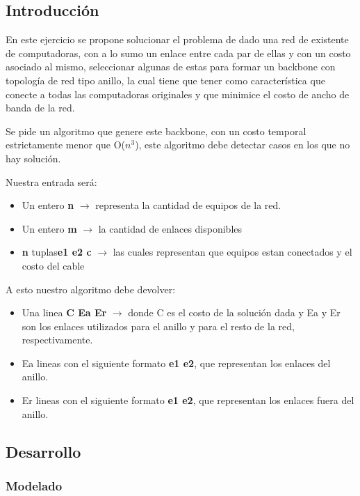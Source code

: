 \subsection{Introducci\'on} 

En este ejercicio se propone solucionar el problema de dado una red de existente de computadoras, con a lo sumo un enlace entre cada par de ellas y con un costo asociado al mismo, seleccionar algunas de estas para formar un backbone con topología de red tipo anillo, la cual tiene que tener como característica que conecte a todas las computadoras originales y que minimice el costo de ancho de banda de la red.

Se pide un algoritmo que genere este backbone, con un costo temporal estrictamente menor que O($n^3$), este algoritmo debe detectar casos en los que no hay solución.

Nuestra entrada ser\'a:
\\
\begin{itemize}
	\item Un entero \textbf{n} $\rightarrow$ representa la cantidad de equipos de la red.
	\item Un entero \textbf{m} $\rightarrow$ la cantidad de enlaces disponibles
	\item \textbf{n} tuplas\textbf{e1 e2 c} $\rightarrow$ las cuales representan que equipos estan conectados y el costo del cable
\end{itemize}

A esto nuestro algoritmo debe devolver:

\begin{itemize}
	\item Una linea \textbf{C Ea Er} $\rightarrow$ donde C es el costo de la solución dada y Ea y Er son los enlaces utilizados para el anillo y para el resto de la red, respectivamente.
	\item Ea lineas con el siguiente formato \textbf{e1 e2}, que representan los enlaces del anillo.
	\item Er lineas con el siguiente formato \textbf{e1 e2}, que representan los enlaces fuera del anillo.
	
\end{itemize}

\subsection{Desarrollo}

\subsubsection{Modelado}


